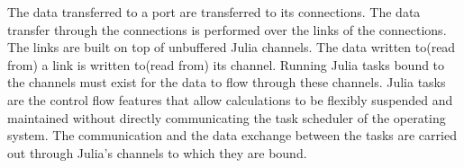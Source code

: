\documentclass{juliacon}
\begin{document}

The data transferred to a port are transferred to its connections. The data transfer through the connections is performed over the links of the connections. The links are built on top of unbuffered Julia channels. The data written to(read from) a link is written to(read from) its channel. Running Julia tasks bound to the channels must exist for the data to flow through these channels. Julia tasks are the control flow features that allow calculations to be flexibly suspended and maintained without directly communicating the task scheduler of the operating system\cite{julialang}. The communication and the data exchange between the tasks are carried out through Julia's channels to which they are bound.

\end{document}

